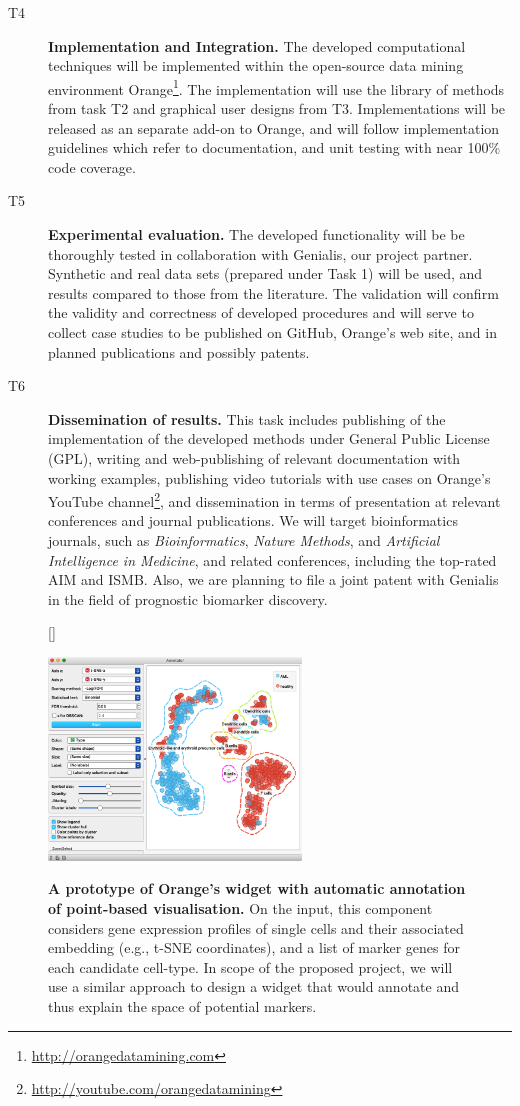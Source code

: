 \documentclass[11pt,a4paper]{article}
\newcommand{\myurl}[1]{\footnote{\url{#1}}}
\renewcommand{\bold}{\textbf}
\begin{document}
\begin{description}
 	\item[T4] \bold{Implementation and Integration.} The developed computational techniques will be implemented within the open-source data mining environment Orange\myurl{http://orangedatamining.com}. The implementation will use the library of methods from task T2 and graphical user designs from T3. Implementations will be released as an separate add-on to Orange, and will follow implementation guidelines which refer to documentation, and unit testing with near 100\% code coverage.
 	\item[T5] \bold{Experimental evaluation.} The developed functionality will be be thoroughly tested in collaboration with Genialis, our project partner. Synthetic and real data sets (prepared under Task 1) will be used, and results compared to those from the literature. The validation will confirm the validity and correctness of developed procedures and will serve to collect case studies to be published on GitHub, Orange's web site, and in planned publications and possibly patents.
 	\item[T6] \bold{Dissemination of results.} This task includes publishing of the implementation of the developed methods under General Public License (GPL), writing and web-publishing of relevant documentation with working examples, publishing video tutorials with use cases on Orange's YouTube channel\myurl{http://youtube.com/orangedatamining}, and dissemination in terms of presentation at relevant conferences and journal publications. We will target bioinformatics journals, such as {\em Bioinformatics}, {\em Nature Methods}, and {\em Artificial Intelligence in Medicine}, and related conferences, including the top-rated AIM and ISMB. Also, we are planning to file a joint patent with Genialis in the field of prognostic biomarker discovery.
\end{description}


\begin{figure}
[\FBwidth]
{\caption{\small\bold{A prototype of Orange's widget with automatic annotation of point-based visualisation.} On the input, this component considers gene expression profiles of single cells and their associated embedding (e.g., t-SNE coordinates), and a list of marker genes for each candidate cell-type. In scope of the proposed project, we will use a similar approach to design a widget that would annotate and thus explain the space of potential markers.}
\label{fig:annotation}}
{\includegraphics[width=0.6\textwidth]{annotation}}
\end{figure}
\end{document}
